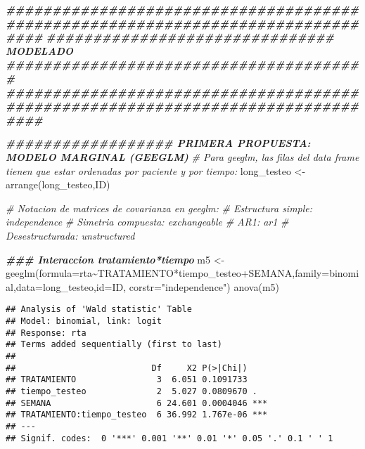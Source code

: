 \documentclass[
]{article}
\newenvironment{Shaded}{\begin{snugshade}}{\end{snugshade}}
\newcommand{\AttributeTok}[1]{\textcolor[rgb]{0.77,0.63,0.00}{#1}}
\newcommand{\CommentTok}[1]{\textcolor[rgb]{0.56,0.35,0.01}{\textit{#1}}}
\newcommand{\DocumentationTok}[1]{\textcolor[rgb]{0.56,0.35,0.01}{\textbf{\textit{#1}}}}
\newcommand{\FunctionTok}[1]{\textcolor[rgb]{0.00,0.00,0.00}{#1}}
\newcommand{\NormalTok}[1]{#1}
\newcommand{\OtherTok}[1]{\textcolor[rgb]{0.56,0.35,0.01}{#1}}
\newcommand{\SpecialCharTok}[1]{\textcolor[rgb]{0.00,0.00,0.00}{#1}}
\newcommand{\StringTok}[1]{\textcolor[rgb]{0.31,0.60,0.02}{#1}}
\begin{document}
\begin{Shaded}
\begin{Highlighting}[]
\DocumentationTok{\#\#\#\#\#\#\#\#\#\#\#\#\#\#\#\#\#\#\#\#\#\#\#\#\#\#\#\#\#\#\#\#\#\#\#\#\#\#\#\#\#\#\#\#\#\#\#\#\#\#\#\#\#\#\#\#\#\#\#\#\#\#\#\#\#\#\#\#\#\#\#\#\#\#\#\#\#\#\#\#}
\DocumentationTok{\#\#\#\#\#\#\#\#\#\#\#\#\#\#\#\#\#\#\#\#\#\#\#\#\#\#\#\#\#\#\# MODELADO \#\#\#\#\#\#\#\#\#\#\#\#\#\#\#\#\#\#\#\#\#\#\#\#\#\#\#\#\#\#\#\#\#\#\#\#\#\#\#}
\DocumentationTok{\#\#\#\#\#\#\#\#\#\#\#\#\#\#\#\#\#\#\#\#\#\#\#\#\#\#\#\#\#\#\#\#\#\#\#\#\#\#\#\#\#\#\#\#\#\#\#\#\#\#\#\#\#\#\#\#\#\#\#\#\#\#\#\#\#\#\#\#\#\#\#\#\#\#\#\#\#\#\#\#}

\DocumentationTok{\#\#\#\#\#\#\#\#\#\#\#\#\#\#\#\#\#\# PRIMERA PROPUESTA: MODELO MARGINAL (GEEGLM)}
\CommentTok{\# Para geeglm, las filas del data frame tienen que estar ordenadas por paciente y por tiempo:}
\NormalTok{long\_testeo }\OtherTok{\textless{}{-}} \FunctionTok{arrange}\NormalTok{(long\_testeo,ID)}

\CommentTok{\# Notacion de matrices de covarianza en geeglm:}
\CommentTok{\# Estructura simple: independence}
\CommentTok{\# Simetria compuesta: exchangeable}
\CommentTok{\# AR1: ar1}
\CommentTok{\# Desestructurada: unstructured}

\DocumentationTok{\#\#\# Interaccion tratamiento*tiempo}
\NormalTok{m5 }\OtherTok{\textless{}{-}} \FunctionTok{geeglm}\NormalTok{(}\AttributeTok{formula=}\NormalTok{rta}\SpecialCharTok{\textasciitilde{}}\NormalTok{TRATAMIENTO}\SpecialCharTok{*}\NormalTok{tiempo\_testeo}\SpecialCharTok{+}\NormalTok{SEMANA,}\AttributeTok{family=}\NormalTok{binomial,}\AttributeTok{data=}\NormalTok{long\_testeo,}\AttributeTok{id=}\NormalTok{ID,}
             \AttributeTok{corstr=}\StringTok{"independence"}\NormalTok{)}
\FunctionTok{anova}\NormalTok{(m5)}
\end{Highlighting}
\end{Shaded}

\begin{verbatim}
## Analysis of 'Wald statistic' Table
## Model: binomial, link: logit
## Response: rta
## Terms added sequentially (first to last)
## 
##                           Df     X2 P(>|Chi|)    
## TRATAMIENTO                3  6.051 0.1091733    
## tiempo_testeo              2  5.027 0.0809670 .  
## SEMANA                     6 24.601 0.0004046 ***
## TRATAMIENTO:tiempo_testeo  6 36.992 1.767e-06 ***
## ---
## Signif. codes:  0 '***' 0.001 '**' 0.01 '*' 0.05 '.' 0.1 ' ' 1
\end{verbatim}
\end{document}
